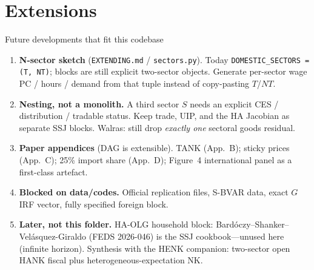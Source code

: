 \documentclass[11pt,aspectratio=169]{beamer}
\begin{document}
\section{Extensions}
\begin{frame}{Future developments that fit this codebase}
  \begin{enumerate}
    \item \textbf{N-sector sketch} (\texttt{EXTENDING.md} / \texttt{sectors.py}).
          Today \texttt{DOMESTIC\_SECTORS = (T, NT)}; blocks are still
          explicit two-sector objects. Generate per-sector wage PC / hours /
          demand from that tuple instead of copy-pasting $T$/$NT$.
    \item \textbf{Nesting, not a monolith.}
          A third sector $S$ needs an explicit CES / distribution / tradable
          status. Keep trade, UIP, and the HA Jacobian as separate SSJ
          blocks. Walras: still drop \emph{exactly one} sectoral goods
          residual.
    \item \textbf{Paper appendices} (DAG is extensible).
          TANK (App.~B); sticky prices (App.~C); 25\% import share (App.~D);
          Figure~4 international panel as a first-class artefact.
    \item \textbf{Blocked on data/codes.}
          Official replication files, S-BVAR data, exact $G$ IRF vector,
          fully specified foreign block.
    \item \textbf{Later, not this folder.}
          HA-OLG household block: Bard\'oczy--Shanker--Vel\'asquez-Giraldo
          (FEDS 2026-046) is the SSJ cookbook---unused here (infinite horizon).
          Synthesis with the HENK companion: two-sector open HANK fiscal
          plus heterogeneous-expectation NK.
  \end{enumerate}
\end{frame}
\end{document}
